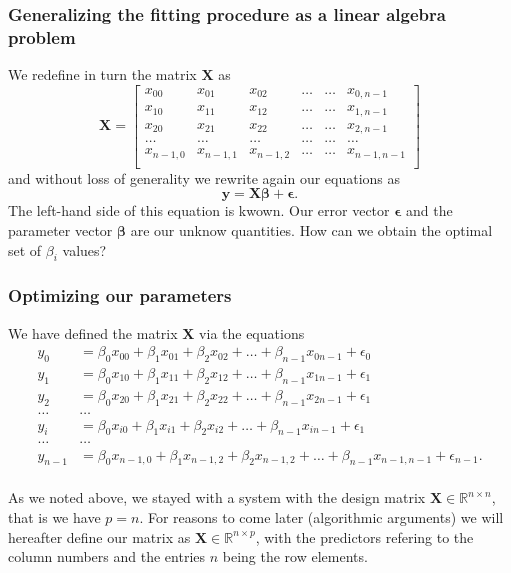 \documentclass{beamer}
\begin{document}
\begin{frame}
\frametitle{Generalizing the fitting procedure as a linear algebra problem}

\begin{block}{}
We redefine in turn the matrix $\bm{X}$ as
\[
\bm{X}=
\begin{bmatrix} 
x_{00}& x_{01} &x_{02}& \dots & \dots &x_{0,n-1}\\
x_{10}& x_{11} &x_{12}& \dots & \dots &x_{1,n-1}\\
x_{20}& x_{21} &x_{22}& \dots & \dots &x_{2,n-1}\\                      
\dots& \dots &\dots& \dots & \dots &\dots\\
x_{n-1,0}& x_{n-1,1} &x_{n-1,2}& \dots & \dots &x_{n-1,n-1}\\
\end{bmatrix} 
\]
and without loss of generality we rewrite again  our equations as
\[
\bm{y} = \bm{X}\bm{\beta}+\bm{\epsilon}.
\]
The left-hand side of this equation is kwown. Our error vector $\bm{\epsilon}$ and the parameter vector $\bm{\beta}$ are our unknow quantities. How can we obtain the optimal set of $\beta_i$ values? 
\end{block}
\end{frame}

\begin{frame}
\frametitle{Optimizing our parameters}

\begin{block}{}
We have defined the matrix $\bm{X}$ via the equations
\begin{align*}
y_0&=\beta_0x_{00}+\beta_1x_{01}+\beta_2x_{02}+\dots+\beta_{n-1}x_{0n-1}+\epsilon_0\\
y_1&=\beta_0x_{10}+\beta_1x_{11}+\beta_2x_{12}+\dots+\beta_{n-1}x_{1n-1}+\epsilon_1\\
y_2&=\beta_0x_{20}+\beta_1x_{21}+\beta_2x_{22}+\dots+\beta_{n-1}x_{2n-1}+\epsilon_1\\
\dots & \dots \\
y_{i}&=\beta_0x_{i0}+\beta_1x_{i1}+\beta_2x_{i2}+\dots+\beta_{n-1}x_{in-1}+\epsilon_1\\
\dots & \dots \\
y_{n-1}&=\beta_0x_{n-1,0}+\beta_1x_{n-1,2}+\beta_2x_{n-1,2}+\dots+\beta_{n-1}x_{n-1,n-1}+\epsilon_{n-1}.\\
\end{align*}

As we noted above, we stayed with a system with the design matrix 
 $\bm{X}\in {\mathbb{R}}^{n\times n}$, that is we have $p=n$. For reasons to come later (algorithmic arguments) we will hereafter define 
our matrix as $\bm{X}\in {\mathbb{R}}^{n\times p}$, with the predictors refering to the column numbers and the entries $n$ being the row elements.

\end{block}
\end{frame}
\end{document}
